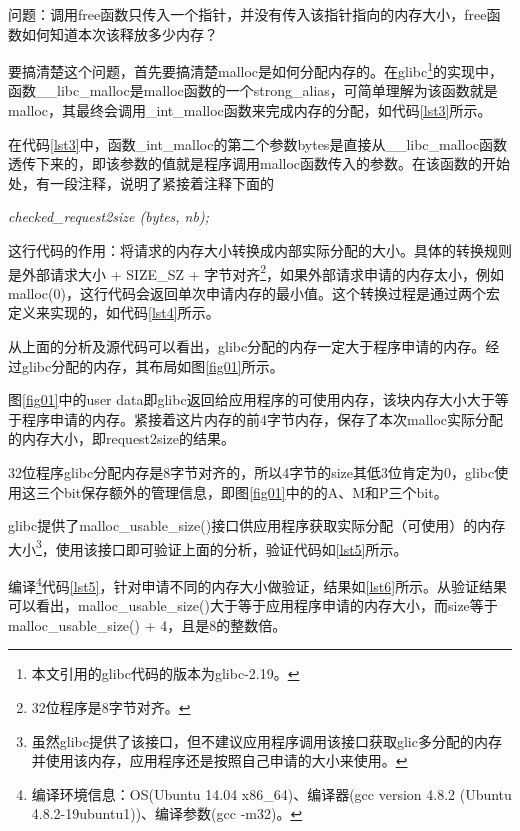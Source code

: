 \documentclass[a4paper, 12pt, titlepage]{article}
\begin{document}
问题：调用free函数只传入一个指针，并没有传入该指针指向的内存大小，free函数如何知道本次该释放多少内存？

要搞清楚这个问题，首先要搞清楚malloc是如何分配内存的。在glibc\footnote{本文引用的glibc代码的版本为glibc-2.19。}的实现中，函数\_\_libc\_malloc是malloc函数的一个strong\_alias，可简单理解为该函数就是malloc，其最终会调用\_int\_malloc函数来完成内存的分配，如代码\ref{lst3}所示。
\begin{spacing}{1.0}
  
\end{spacing}

在代码\ref{lst3}中，函数\_int\_malloc的第二个参数bytes是直接从\_\_libc\_malloc函数透传下来的，即该参数的值就是程序调用malloc函数传入的参数。在该函数的开始处，有一段注释，说明了紧接着注释下面的
\begin{center}
\textsl{checked\_request2size (bytes, nb);}
\end{center}
这行代码的作用：{\color{blue}将请求的内存大小转换成内部实际分配的大小。具体的转换规则是外部请求大小 + SIZE\_SZ + 字节对齐\footnote{32位程序是8字节对齐。}，如果外部请求申请的内存太小，例如malloc(0)，这行代码会返回单次申请内存的最小值}。这个转换过程是通过两个宏定义来实现的，如代码\ref{lst4}所示。
\begin{spacing}{1.0}
  
\end{spacing}
从上面的分析及源代码可以看出，glibc分配的内存一定大于程序申请的内存。经过glibc分配的内存，其布局如图\ref{fig01}所示。


图\ref{fig01}中的user data即glibc返回给应用程序的可使用内存，该块内存大小大于等于程序申请的内存。紧接着这片内存的前4字节内存，保存了本次malloc实际分配的内存大小，即request2size的结果。

32位程序glibc分配内存是8字节对齐的，所以4字节的size其低3位肯定为0，glibc使用这三个bit保存额外的管理信息，即图\ref{fig01}中的的A、M和P三个bit。

glibc提供了malloc\_usable\_size()接口供应用程序获取实际分配（可使用）的内存大小\footnote{虽然glibc提供了该接口，但不建议应用程序调用该接口获取glic多分配的内存并使用该内存，应用程序还是按照自己申请的大小来使用。}，使用该接口即可验证上面的分析，验证代码如\ref{lst5}所示。
\begin{spacing}{1.0}
  
\end{spacing}

编译\footnote{编译环境信息：OS(Ubuntu 14.04 x86\_64)、编译器(gcc version 4.8.2 (Ubuntu 4.8.2-19ubuntu1))、编译参数(gcc -m32)。}代码\ref{lst5}，针对申请不同的内存大小做验证，结果如\ref{lst6}所示。从验证结果可以看出，malloc\_usable\_size()大于等于应用程序申请的内存大小，而size等于malloc\_usable\_size() + 4，且是8的整数倍。
\end{document}
